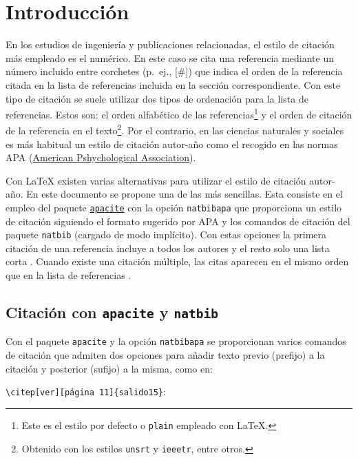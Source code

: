 \chapter{Introducción}
\label{cap:Introduccion}

En los estudios de ingeniería y publicaciones relacionadas, el estilo de citación más empleado es el numérico. En este caso se cita una referencia mediante un número incluido entre corchetes (p.~ej., [\#]) que indica el orden de la referencia citada en la lista de referencias incluida en la sección correspondiente. Con este tipo de citación se suele utilizar dos tipos de ordenación para la lista de referencias. Estos son: el orden alfabético de las referencias\footnote{Este es el estilo por defecto o \texttt{plain} empleado con \LaTeX.} y el orden de citación de la referencia en el texto\footnote{Obtenido con los estilos \texttt{unsrt} y \texttt{ieeetr}, entre otros.}. Por el contrario, en las ciencias naturales y sociales es más habitual un estilo de citación autor-año como el recogido en las normas APA (\href{https://apastyle.apa.org/learn/faqs/format-bibliography}{American Pshychological Association}).

Con \LaTeX{} existen varias alternativas para utilizar el estilo de citación autor-año. En este documento se propone una de las más sencillas. Esta consiste en el empleo del paquete \href{https://ctan.javinator9889.com/biblio/bibtex/contrib/apacite/apacite.pdf}{\texttt{apacite}} con la opción \texttt{natbibapa} que proporciona un estilo de citación siguiendo el formato sugerido por APA y los comandos de citación del paquete \texttt{natbib} (cargado de modo implícito). Con estas opciones la primera citación de una referencia incluye a todos los autores \citep[como por ejemplo en][]{oetiker06} y el resto solo una lista corta \citep{oetiker06}. Cuando existe una citación múltiple, las citas aparecen en el mismo orden que en la lista de referencias \citep[como por ejemplo en][]{lamport94, cascales00,goos04,kopka04}.

\section{Citación con \texttt{apacite} y \texttt{natbib}}
Con el paquete \texttt{apacite} y la opción \texttt{natbibapa} se proporcionan varios comandos de citación que admiten dos opciones para añadir texto previo (prefijo) a la citación y posterior (sufijo) a la misma, como en:

   \verb+\citep[ver][página 11]{salido15}+: \citep[ver][página 5]{salido15} 

